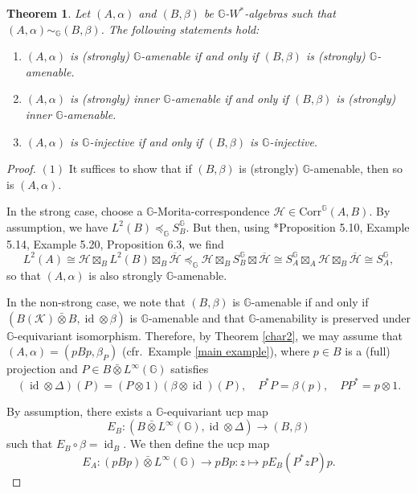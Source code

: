 \documentclass[reqno]{amsart}
\numberwithin{equation}{section}
\newtheorem{Theorem}{Theorem}[section]
\DeclareMathOperator{\id}{\mathrm{id}}
\newcommand{\G}{\mathbb{G}}
\newcommand{\Corr}{\mathrm{Corr}}
\newcommand{\ovot}{\bar{\otimes}}
\begin{document}
\begin{Theorem}\label{MoritaApplication}
    Let $(A, \alpha)$ and $(B, \beta)$ be $\G$-$W^*$-algebras such that $(A, \alpha)\sim_\G (B, \beta)$. The following statements hold:
    \begin{enumerate}\setlength\itemsep{-0.5em}
        \item $(A, \alpha)$ is (strongly) $\G$-amenable if and only if $(B, \beta)$ is (strongly) $\G$-amenable.
\item $(A, \alpha)$ is (strongly) inner $\G$-amenable if and only if $(B, \beta)$ is (strongly) inner $\G$-amenable.
\item $(A, \alpha)$ is $\G$-injective if and only if $(B, \beta)$ is $\G$-injective.
    \end{enumerate}
\end{Theorem}
\begin{proof}
    $(1)$ It suffices to show that if $(B,\beta)$ is (strongly) $\G$-amenable, then so is $(A, \alpha)$. 

  In the strong case, choose a $\G$-Morita-correspondence $\mathcal{H}\in \Corr^\G(A,B)$. By assumption, we have $L^2(B) \preccurlyeq_\G S_B^\G$. But then, using \cite{DCDR24a}*{Proposition 5.10, Example 5.14, Example 5.20, Proposition 6.3}, we find
  $$L^2(A) \cong \mathcal{H}\boxtimes_B L^2(B) \boxtimes_B \overline{\mathcal{H}}\preccurlyeq_\G \mathcal{H}\boxtimes_B S_B^\G \boxtimes \overline{\mathcal{H}}\cong S_A^\G \boxtimes_A\mathcal{H}\boxtimes_B \overline{\mathcal{H}}\cong S_A^\G,$$
    so that $(A, \alpha)$ is also strongly $\G$-amenable.

In the non-strong case, we note that $(B, \beta)$ is $\G$-amenable if and only if $(B(\mathcal{K})\ovot B, \id \otimes \beta)$ is $\G$-amenable and that $\G$-amenability is preserved under $\G$-equivariant isomorphism. Therefore, by Theorem \ref{char2}, we may assume that $(A, \alpha)= (pBp, \beta_P)$ (cfr.\ Example \ref{main example}), where $p\in B$ is a (full) projection and $P\in B \ovot L^\infty(\G)$ satisfies
    $$(\id \otimes \Delta)(P) = (P\otimes 1) (\beta \otimes \id)(P), \quad P^*P=\beta(p), \quad PP^* = p\otimes 1.$$

By assumption, there exists a $\G$-equivariant ucp map
$$E_B: (B \ovot L^\infty(\G), \id \otimes \Delta)\to (B, \beta)$$
    such that $E_B\circ \beta = \id_B$. We then define the ucp map
    $$E_A: (pBp) \ovot L^\infty(\G)\to pBp: z \mapsto pE_B(P^*zP)p.$$


\end{proof}
\end{document}
